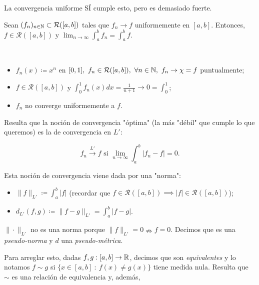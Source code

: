 \begin{remark}
	La convergencia uniforme SÍ cumple esto, pero es demasiado fuerte.
\end{remark}

\begin{ex}[Guía 1]
	Sean $(f_n)_{n \in \mathbb{N}} \subset \mathcal{R}([a,b])$ tales que $f_n \to f$ uniformemente en $[a,b]$. Entonces, $f \in \mathcal{R}([a,b])$ y $\lim_{n \to \infty} \int_{a}^{b} f_n = \int_{a}^{b} f$.
\end{ex}

\begin{eg}[3]~
	\begin{itemize}
		\item $f_n (x) \coloneq x^n$ en $[0,1],\ f_n \in \mathcal{R}([a,b]),\ \forall n \in \N,\ f_n \to \chi = f$ puntualmente;

		\item $f \in \mathcal{R}([a,b])$ y $\int_{0}^{1} f_n (x) dx = \frac{1}{n+1} \to 0 = \int_{0}^{1}$;

		\item $f_n$ no converge uniformemente a $f$.
	\end{itemize}
\end{eg}

Resulta que la noción de convergencia "óptima" (la más "débil" que cumple lo que queremos) es la de convergencia en $L'$:

\[
f_n \xrightarrow{L'} f \text{ si } \lim_{n \to \infty} \int_{a}^{b} | f_n - f | = 0.
\]

Esta noción de convergencia viene dada por una "norma":

\begin{itemize}
	\item $\| f \|_{L'} \coloneq \int_{a}^{b} |f|$ (recordar que $f \in \mathcal{R}([a,b]) \implies |f| \in \mathcal{R}([a,b])$);

	\item $d_{L'} (f,g) \coloneq \| f - g \|_{L'} = \int_{a}^{b} |f-g|$.
\end{itemize}

\begin{remark}
	$\| \cdot \|_{L'}$ no es una norma porque $\| f \|_{L'} = 0 \nRightarrow f = 0$. Decimos que es una \textit{pseudo-norma} y $d$ una \textit{pseudo-métrica}.
\end{remark}

Para arreglar esto, dadas $f,g : [a,b] \to \mathbb{R}$, decimos que son \textit{equivalentes} y lo notamos $f \sim g$ si $\{ x \in [a,b] \ : \ f(x) \neq g(x) \}$ tiene medida nula. Resulta que $\sim$ es una relación de equivalencia y, además,


